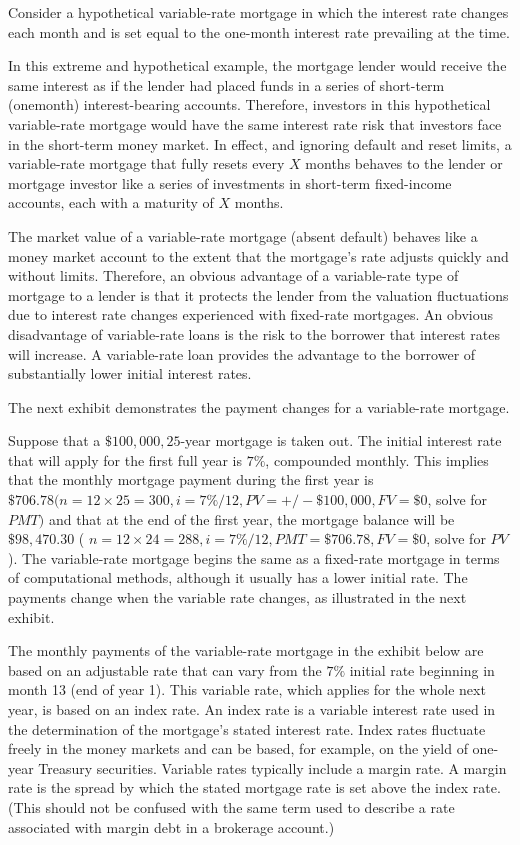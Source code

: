 \documentclass[11pt]{article}
\begin{document}
Consider a hypothetical variable-rate mortgage in which the interest rate changes each month and is set equal to the one-month interest rate prevailing at the time.

In this extreme and hypothetical example, the mortgage lender would receive the same interest as if the lender had placed funds in a series of short-term (onemonth) interest-bearing accounts. Therefore, investors in this hypothetical variable-rate mortgage would have the same interest rate risk that investors face in the short-term money market. In effect, and ignoring default and reset limits, a variable-rate mortgage that fully resets every $X$ months behaves to the lender or mortgage investor like a series of investments in short-term fixed-income accounts, each with a maturity of $X$ months.

The market value of a variable-rate mortgage (absent default) behaves like a money market account to the extent that the mortgage's rate adjusts quickly and without limits. Therefore, an obvious advantage of a variable-rate type of mortgage to a lender is that it protects the lender from the valuation fluctuations due to interest rate changes experienced with fixed-rate mortgages. An obvious disadvantage of variable-rate loans is the risk to the borrower that interest rates will increase. A variable-rate loan provides the advantage to the borrower of substantially lower initial interest rates.

The next exhibit demonstrates the payment changes for a variable-rate mortgage.

Suppose that a $\$ 100,000,25$-year mortgage is taken out. The initial interest rate that will apply for the first full year is $7 \%$, compounded monthly. This implies that the monthly mortgage payment during the first year is $\$ 706.78(n=12 \times 25=300, i=7 \% / 12, P V=+/-\$ 100,000, F V=\$ 0$, solve for $P M T)$ and that at the end of the first year, the mortgage balance will be $\$ 98,470.30$ ( $n=12 \times 24=288, i=7 \% / 12, P M T=\$ 706.78, F V=\$ 0$, solve for $P V$ ). The variable-rate mortgage begins the same as a fixed-rate mortgage in terms of computational methods, although it usually has a lower initial rate. The payments change when the variable rate changes, as illustrated in the next exhibit.

The monthly payments of the variable-rate mortgage in the exhibit below are based on an adjustable rate that can vary from the $7 \%$ initial rate beginning in month 13 (end of year 1). This variable rate, which applies for the whole next year, is based on an index rate. An index rate is a variable interest rate used in the determination of the mortgage's stated interest rate. Index rates fluctuate freely in the money markets and can be based, for example, on the yield of one-year Treasury securities. Variable rates typically include a margin rate. A margin rate is the spread by which the stated mortgage rate is set above the index rate. (This should not be confused with the same term used to describe a rate associated with margin debt in a brokerage account.)
\end{document}
